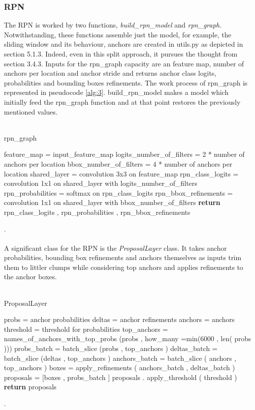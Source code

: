  \subsubsection{RPN}

The RPN is worked by two functions,\textit{ build\_rpn\_model} and \textit{rpn\_graph}. Notwithstanding, these functions assemble just the model, for example, the sliding window and its behaviour, anchors are created in utils.py as depicted in section 5.1.3. Indeed, even in this split approach, it pursues the thought from section 3.4.3. Inputs for the rpn\_graph capacity are an feature map, number of anchors per location and anchor stride and returns anchor class logits, probabilities and bounding boxes refinements. The work process of rpn\_graph is represented in pseudocode \ref{alg:3}. build\_rpn\_model makes a model which initially feed the rpn\_graph function and at that point restores the previously mentioned values.
\\
\\
\begin{algorithm}[H] \label{alg:3}
  \caption{rpn\_graph}
  \SetAlgoLined
  \DontPrintSemicolon
  feature\_map = input\_feature\_map\;
  logits\_number\_of\_filters = 2 * number of anchors per location\;
   bbox\_number\_of\_filters = 4 * number of anchors per location\;
   shared\_layer = convolution 3x3 on feature\_map\;
   rpn\_class\_logits = convolution 1x1 on shared\_layer with logits\_number\_of\_filters\;
  rpn\_probabilities = softmax on rpn\_class\_logits\;
   rpn\_bbox\_refinements = convolution 1x1 on shared\_layer with bbox\_number\_of\_filters\;
   \textbf{return} rpn\_class\_logits , rpn\_probabilities , rpn\_bbox\_refinements\;
  
  \end{algorithm}
  .\\
\\
  A significant class for the RPN is the \textit{ProposalLayer} class. It takes anchor probabilities, bounding box refinements and anchors themselves as inputs trim them to littler clumps while considering top anchors and applies refinements to the anchor boxes.
\\
\\
\begin{algorithm}[H] \label{alg:4}
  \caption{ProposalLayer}
  \SetAlgoLined
  \DontPrintSemicolon

probs = anchor probabilities\;
deltas = anchor refinements\;
anchors = anchors\;
threshold = threshold for probabilities\;
top\_anchors = names\_of\_anchors\_with\_top\_probs (probs , how\_many =min(6000 , len( probs )))\;
 probs\_batch = batch\_slice (probs , top\_anchors )\;
 deltas\_batch = batch\_slice (deltas , top\_anchors )\;
 anchors\_batch = batch\_slice ( anchors , top\_anchors )\;
 boxes = apply\_refinements ( anchors\_batch , deltas\_batch )\;
 proposals = [boxes , probs\_batch ]\;
 proposals . apply\_threshold ( threshold )\;
 \textbf{return} proposals\;

  \end{algorithm}
  .\\
  \\
\clearpage
